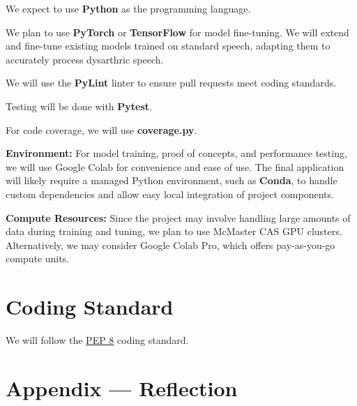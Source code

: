 \documentclass{article}
\begin{document}
We expect to use \textbf{Python} as the programming language. 

We plan to use \textbf{PyTorch} or \textbf{TensorFlow} for model fine-tuning. We will extend and fine-tune existing models trained on standard speech, adapting them to accurately process dysarthric speech.

We will use the \textbf{PyLint} linter to ensure pull requests meet coding standards.

Testing will be done with \textbf{Pytest}.

For code coverage, we will use \textbf{coverage.py}.

\bigskip
\noindent\textbf{Environment:} For model training, proof of concepts, and performance testing, we will use Google Colab for convenience and ease of use. The final application will likely require a managed Python environment, such as \textbf{Conda}, to handle custom dependencies and allow easy local integration of project components.

\bigskip
\noindent\textbf{Compute Resources:} Since the project may involve handling large amounts of data during training and tuning, we plan to use McMaster CAS GPU clusters. Alternatively, we may consider Google Colab Pro, which offers pay-as-you-go compute units.


\section{Coding Standard}

We will follow the \href{https://peps.python.org/pep-0008/}{PEP 8} coding standard.


\newpage{}

\section*{Appendix --- Reflection}



\end{document}

